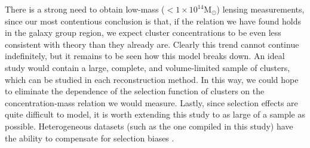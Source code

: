 There is a strong need to obtain low-mass ($\mathrm{< 1\times 10^{14}
  M_{\odot}}$) lensing measurements, since our most contentious conclusion is that, if the
  relation we have found holds in the galaxy group region, we expect cluster
  concentrations to be even less consistent with theory than they already
  are. Clearly this trend cannot continue indefinitely, but it remains to be
  seen how this model breaks down. An ideal study would contain a large,
  complete, and volume-limited sample of clusters, which can be studied in each
  reconstruction method. In this way, we could hope to eliminate the dependence
  of the selection function of clusters on the concentration-mass relation we
  would measure. Lastly, since selection effects are quite difficult to model, it is
  worth extending this study to as large of a sample as possible. Heterogeneous
  datasets (such as the one compiled in this study) have the ability to
  compensate for selection biases \citep{GO01.1,PI11.1,SE15.3}.